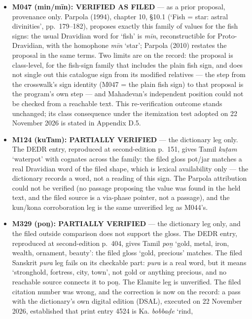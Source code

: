 \documentclass[11pt]{article}
\providecommand{\tightlist}{%
  \setlength{\itemsep}{0pt}\setlength{\parskip}{0pt}}
\begin{document}
\begin{itemize}
\tightlist
\item
  \textbf{M047 (min/mīn): VERIFIED AS FILED} --- as a prior
  proposal, provenance only. Parpola (1994), chapter 10, §10.1
  (`Fish = star: astral divinities', pp.~179--182), proposes
  exactly this family of values for the fish signs: the usual
  Dravidian word for `fish' is \emph{mīn}, reconstructible for
  Proto-Dravidian, with the homophone \emph{mīn} `star'; Parpola
  (2010) restates the proposal in the same terms. Two limits are
  on the record: the proposal is class-level, for the fish-sign
  family that includes the plain fish sign, and does not single
  out this catalogue sign from its modified relatives --- the
  step from the crosswalk's sign identity (M047 = the plain fish
  sign) to that proposal is the program's own step --- and
  Mahadevan's independent position could not be checked from a
  reachable text. This re-verification outcome stands unchanged;
  its class consequence under the itemization test adopted on
  22 November 2026 is stated in Appendix D.5.
\item
  \textbf{M124 (kuTam): PARTIALLY VERIFIED} --- the dictionary
  leg only. The DEDR entry, reproduced at second-edition
  p.~151, gives Tamil \emph{kuṭam} `waterpot' with cognates
  across the family: the filed gloss pot/jar matches a real
  Dravidian word of the filed shape, which is lexical
  availability only --- the dictionary records a word, not a
  reading of this sign. The Parpola attribution could not be
  verified (no passage proposing the value was found in the held
  text, and the filed source is a via-phase pointer, not a
  passage), and the kun/kona corroboration leg is the same
  unverified leg as M044's.
\item
  \textbf{M329 (poṉ): PARTIALLY VERIFIED} --- the dictionary leg
  only, and the filed outside comparison does not support the
  gloss. The DEDR entry, reproduced at second-edition p.~404,
  gives Tamil \emph{poṉ} `gold, metal, iron, wealth, ornament,
  beauty': the filed gloss `gold, precious' matches. The filed
  Sanskrit \emph{pura} leg fails on its checkable part:
  \emph{pura} is a real word, but it means `stronghold,
  fortress, city, town', not gold or anything precious, and no
  reachable source connects it to poṉ. The Elamite leg is
  unverified. The filed citation number was wrong, and the
  correction is now on the record: a pass with the dictionary's
  own digital edition (DSAL), executed on 22 November 2026,
  established that print entry 4524 is Ka. \emph{bobbaḍe} `rind,

\end{itemize}
\end{document}
